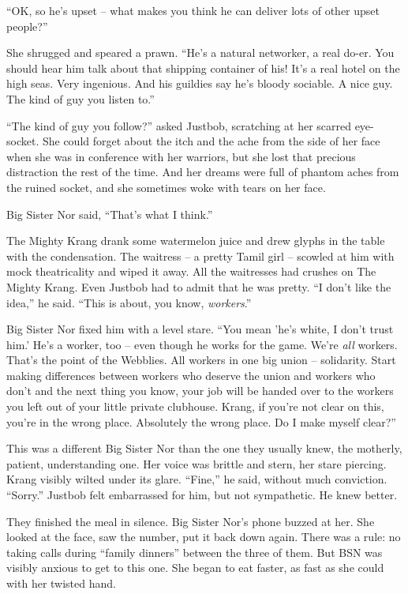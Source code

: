 ``OK, so he's upset -- what makes you think he can deliver lots of
other upset people?''

She shrugged and speared a prawn. ``He's a natural networker, a real
do-er. You should hear him talk about that shipping container of
his! It's a real hotel on the high seas. Very ingenious. And his
guildies say he's bloody sociable. A nice guy. The kind of guy you
listen to.''

``The kind of guy you follow?'' asked Justbob, scratching at her
scarred eye-socket. She could forget about the itch and the ache
from the side of her face when she was in conference with her
warriors, but she lost that precious distraction the rest of the
time. And her dreams were full of phantom aches from the ruined
socket, and she sometimes woke with tears on her face.

Big Sister Nor said, ``That's what I think.''

The Mighty Krang drank some watermelon juice and drew glyphs in the
table with the condensation. The waitress -- a pretty Tamil girl --
scowled at him with mock theatricality and wiped it away. All the
waitresses had crushes on The Mighty Krang. Even Justbob had to
admit that he was pretty. ``I don't like the idea,'' he said. ``This
is about, you know, \emph{workers}.''

Big Sister Nor fixed him with a level stare. ``You mean 'he's white,
I don't trust him.' He's a worker, too -- even though he works for
the game. We're \emph{all} workers. That's the point of the
Webblies. All workers in one big union -- solidarity. Start making
differences between workers who deserve the union and workers who
don't and the next thing you know, your job will be handed over to
the workers you left out of your little private clubhouse. Krang,
if you're not clear on this, you're in the wrong place. Absolutely
the wrong place. Do I make myself clear?''

This was a different Big Sister Nor than the one they usually knew,
the motherly, patient, understanding one. Her voice was brittle and
stern, her stare piercing. Krang visibly wilted under its glare.
``Fine,'' he said, without much conviction. ``Sorry.'' Justbob felt
embarrassed for him, but not sympathetic. He knew better.

They finished the meal in silence. Big Sister Nor's phone buzzed at
her. She looked at the face, saw the number, put it back down
again. There was a rule: no taking calls during ``family dinners''
between the three of them. But BSN was visibly anxious to get to
this one. She began to eat faster, as fast as she could with her
twisted hand.

